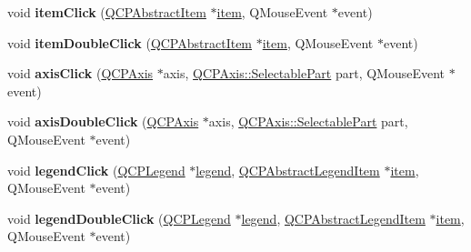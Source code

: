 \begin{DoxyCompactItemize}
\item 
void {\bfseries item\+Click} (\hyperlink{class_q_c_p_abstract_item}{Q\+C\+P\+Abstract\+Item} $\ast$\hyperlink{class_q_custom_plot_a3e842b5a65b1d17fbb96cfb1fa1314d1}{item}, Q\+Mouse\+Event $\ast$event)\hypertarget{class_q_custom_plot_ae16b51f52d2b7aebbc7e3e74e6ff2e4b}{}\label{class_q_custom_plot_ae16b51f52d2b7aebbc7e3e74e6ff2e4b}

\item 
void {\bfseries item\+Double\+Click} (\hyperlink{class_q_c_p_abstract_item}{Q\+C\+P\+Abstract\+Item} $\ast$\hyperlink{class_q_custom_plot_a3e842b5a65b1d17fbb96cfb1fa1314d1}{item}, Q\+Mouse\+Event $\ast$event)\hypertarget{class_q_custom_plot_ac83aa9f5a3e9bb3efc9cdc763dcd42a6}{}\label{class_q_custom_plot_ac83aa9f5a3e9bb3efc9cdc763dcd42a6}

\item 
void {\bfseries axis\+Click} (\hyperlink{class_q_c_p_axis}{Q\+C\+P\+Axis} $\ast$axis, \hyperlink{class_q_c_p_axis_abee4c7a54c468b1385dfce2c898b115f}{Q\+C\+P\+Axis\+::\+Selectable\+Part} part, Q\+Mouse\+Event $\ast$event)\hypertarget{class_q_custom_plot_abf635f8b56ab5c16d5de9f358543e82b}{}\label{class_q_custom_plot_abf635f8b56ab5c16d5de9f358543e82b}

\item 
void {\bfseries axis\+Double\+Click} (\hyperlink{class_q_c_p_axis}{Q\+C\+P\+Axis} $\ast$axis, \hyperlink{class_q_c_p_axis_abee4c7a54c468b1385dfce2c898b115f}{Q\+C\+P\+Axis\+::\+Selectable\+Part} part, Q\+Mouse\+Event $\ast$event)\hypertarget{class_q_custom_plot_a6df35357460181a72da3e93d600f5256}{}\label{class_q_custom_plot_a6df35357460181a72da3e93d600f5256}

\item 
void {\bfseries legend\+Click} (\hyperlink{class_q_c_p_legend}{Q\+C\+P\+Legend} $\ast$\hyperlink{class_q_custom_plot_a4eadcd237dc6a09938b68b16877fa6af}{legend}, \hyperlink{class_q_c_p_abstract_legend_item}{Q\+C\+P\+Abstract\+Legend\+Item} $\ast$\hyperlink{class_q_custom_plot_a3e842b5a65b1d17fbb96cfb1fa1314d1}{item}, Q\+Mouse\+Event $\ast$event)\hypertarget{class_q_custom_plot_a79cff0baafbca10a3aaf694d2d3b9ab3}{}\label{class_q_custom_plot_a79cff0baafbca10a3aaf694d2d3b9ab3}

\item 
void {\bfseries legend\+Double\+Click} (\hyperlink{class_q_c_p_legend}{Q\+C\+P\+Legend} $\ast$\hyperlink{class_q_custom_plot_a4eadcd237dc6a09938b68b16877fa6af}{legend}, \hyperlink{class_q_c_p_abstract_legend_item}{Q\+C\+P\+Abstract\+Legend\+Item} $\ast$\hyperlink{class_q_custom_plot_a3e842b5a65b1d17fbb96cfb1fa1314d1}{item}, Q\+Mouse\+Event $\ast$event)\hypertarget{class_q_custom_plot_a0250f835c044521df1619b132288bca7}{}\label{class_q_custom_plot_a0250f835c044521df1619b132288bca7}


\end{DoxyCompactItemize}
